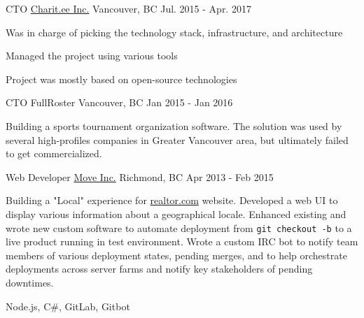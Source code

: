 \begin{cventries}
  \cventry
    {CTO}
    {\href{https://charit.ee}{\faGlobe\enspace Charit.ee Inc.}}
    {Vancouver, BC}
    {Jul. 2015 - Apr. 2017}
    {
      \begin{cvitems}
        \item {Was in charge of picking the technology stack, infrastructure, and architecture}
        \item {Managed the project using various tools}
        \item {Project was mostly based on open-source technologies}
      \end{cvitems}
      \hfill\break
      \begin{cvskills}
      \end{cvskills}
    }

  \hfill\break
  \cventry
    {CTO}
    {FullRoster}
    {Vancouver, BC}
    {Jan 2015 - Jan 2016}
    {
      Building a sports tournament organization software. The solution was used by several high-profiles companies in Greater Vancouver area, but ultimately failed to get commercialized.
      \begin{cvskills}
      \end{cvskills}
    }
  \cventry
    {Web Developer}
    {\href{https://move.com}{\faGlobe\enspace Move Inc.}}
    {Richmond, BC}
    {Apr 2013 - Feb 2015}
    {
      Building a "Local" experience for \href{https://www.realtor.com/local/}{realtor.com} website. Developed a web UI to display various information about a geographical locale. Enhanced existing and wrote new custom software to automate deployment from \texttt{git checkout -b} to a live product running in test environment. Wrote a custom IRC bot to notify team members of various deployment states, pending merges, and to help orchestrate deployments across server farms and notify key stakeholders of pending downtimes.
      \begin{cvskills}
         {Node.js, C\#, GitLab, Gitbot}
      \end{cvskills}
    }


\end{cventries}
